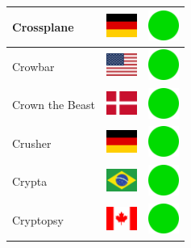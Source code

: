 \documentclass[12pt, a4paper, twoside]{report}
\begin{document}
\begin{center}
\begin{longtable}{|p{5cm}|p{2cm}|p{2cm}|}
 Crossplane                                                 & \includegraphics[width=1cm]{../img/flags/de} &   \includegraphics[width=1cm]{../likes/y} \\ \hline
 Crowbar                                                    & \includegraphics[width=1cm]{../img/flags/us} &   \includegraphics[width=1cm]{../likes/y} \\ \hline
 Crown the Beast                                            & \includegraphics[width=1cm]{../img/flags/dk} &   \includegraphics[width=1cm]{../likes/y} \\ \hline
 Crusher                                                    & \includegraphics[width=1cm]{../img/flags/de} &   \includegraphics[width=1cm]{../likes/y} \\ \hline
 Crypta                                                     & \includegraphics[width=1cm]{../img/flags/br} &   \includegraphics[width=1cm]{../likes/y} \\ \hline
 Cryptopsy                                                  & \includegraphics[width=1cm]{../img/flags/ca} &   \includegraphics[width=1cm]{../likes/y} \\ \hline

\end{longtable}
\end{center}
\end{document}
